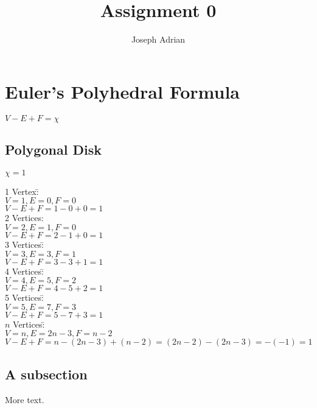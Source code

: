 \documentclass[11pt]{article} %
\title{Assignment 0}
\author{Joseph Adrian}
\date{}
\begin{document}
\maketitle

\section{Euler's Polyhedral Formula}
\begin{center}
$V-E+F=\chi$
\end{center}
\subsection{Polygonal Disk}
\begin{center}
$\chi=1$
\end{center}
\begin{tabbing}
1 Vertex\=: \\
\>$ V=1, E=0, F=0$\\
\>$V-E+F=1-0+0=1 $\\


2 Vertices: \\
\>$ V=2, E=1, F=0$\\
\>$V-E+F=2-1+0=1 $\\


3 Vertices\=: \\
\>$ V=3, E=3, F=1$\\
\>$V-E+F=3-3+1=1 $\\


4 Vertices\=: \\
\>$ V=4, E=5, F=2$\\
\>$V-E+F=4-5+2=1 $\\


5 Vertices\=: \\
\>$ V=5, E=7, F=3$\\
\>$V-E+F=5-7+3=1 $\\


$n$ Vertices\=: \\
\>$ V=n, E=2n-3, F=n-2$\\
\>$V-E+F=n-(2n-3)+(n-2)=(2n-2)-(2n-3)=-(-1)=1 $
\end{tabbing}
\subsection{A subsection}

More text.
\end{document}
